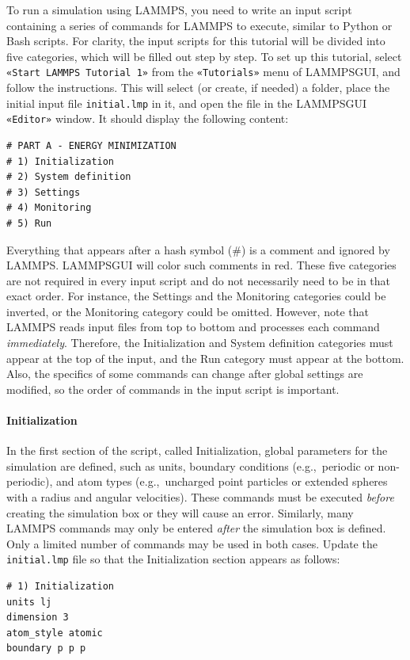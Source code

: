 \documentclass[9pt,tutorial]{livecoms}
\newcommand{\lmpcmd}[1]{\hspace{0pt}\colorbox{listing}{\textcolor{command}{\small{#1}}}\hspace{0pt}} %
\newcommand{\flecmd}[1]{\textcolor{command}{\texttt{#1}}} %
\newcommand{\guicmd}[1]{\textcolor{command}{\texttt{«#1»}}} %
\newcommand{\lammpsgui}{\textsf{LAMMPS\textendash GUI}}
\begin{document}
To run a simulation using LAMMPS, you need to write an input script
containing a series of commands for LAMMPS to execute, similar to Python
or Bash scripts.  For clarity, the input scripts for this tutorial will
be divided into five categories, which will be filled out step by step.
To set up this tutorial, select \guicmd{Start LAMMPS Tutorial 1} from
the \guicmd{Tutorials} menu of \lammpsgui{}, and follow the
instructions.  This will select (or create, if needed) a folder, place
the initial input file \flecmd{initial.lmp} in it, and open the file in
the \lammpsgui{} \guicmd{Editor} window.  It should display the following
content:
\begin{lstlisting}
# PART A - ENERGY MINIMIZATION
# 1) Initialization
# 2) System definition
# 3) Settings
# 4) Monitoring
# 5) Run
\end{lstlisting}
Everything that appears after a hash symbol ($\#$) is a comment
and ignored by LAMMPS.  \lammpsgui{} will color such comments in red.
These five categories are not required in every input script and do not
necessarily need to be in that exact order.  For instance, the \lmpcmd{Settings}
and the \lmpcmd{Monitoring} categories could be inverted, or
the \lmpcmd{Monitoring} category could be omitted.  However, note that
LAMMPS reads input files from top to bottom and processes each command
\emph{immediately}.  Therefore, the \lmpcmd{Initialization} and
\lmpcmd{System definition} categories must appear at the top of the
input, and the \lmpcmd{Run} category must appear at the bottom.  Also, the
specifics of some commands can change after global settings are modified, so the
order of commands in the input script is important.

\paragraph{Initialization}

In the first section of the script, called \lmpcmd{Initialization},
global parameters for the simulation are defined, such as units, boundary conditions
(e.g.,~periodic or non-periodic), and atom types (e.g.,~uncharged point particles
or extended spheres with a radius and angular velocities).  These commands must be
executed \emph{before} creating the simulation box or they will cause
an error.  Similarly, many LAMMPS commands may only be
entered \emph{after} the simulation box is defined.  Only a limited
number of commands may be used in both cases.  Update the \flecmd{initial.lmp} file
so that the \lmpcmd{Initialization} section appears as follows:
\begin{lstlisting}
# 1) Initialization
units lj
dimension 3
atom_style atomic
boundary p p p
\end{lstlisting}
\end{document}
